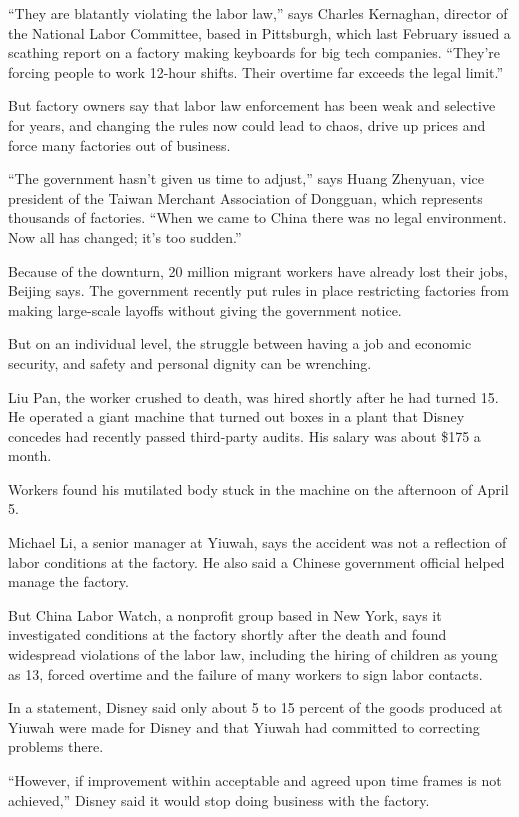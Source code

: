 ﻿\documentclass[12pt,a4paper,onecolumn]{article}
\begin{document}
``They are blatantly violating the labor law,'' says Charles Kernaghan, director of the National
Labor Committee, based in Pittsburgh, which last February issued a scathing report on a factory
making keyboards for big tech companies. ``They're forcing people to work 12-hour shifts. Their
overtime far exceeds the legal limit.''

But factory owners say that labor law enforcement has been weak and selective for years, and
changing the rules now could lead to chaos, drive up prices and force many factories out of
business.

``The government hasn't given us time to adjust,'' says Huang Zhenyuan, vice president of the Taiwan
Merchant Association of Dongguan, which represents thousands of factories. ``When we came to China
there was no legal environment. Now all has changed; it's too sudden.''

Because of the downturn, 20 million migrant workers have already lost their jobs, Beijing says. The
government recently put rules in place restricting factories from making large-scale layoffs without
giving the government notice.

But on an individual level, the struggle between having a job and economic security, and safety and
personal dignity can be wrenching.

Liu Pan, the worker crushed to death, was hired shortly after he had turned 15. He operated a giant
machine that turned out boxes in a plant that Disney concedes had recently passed third-party
audits. His salary was about \$175 a month.

Workers found his mutilated body stuck in the machine on the afternoon of April 5.

Michael Li, a senior manager at Yiuwah, says the accident was not a reflection of labor conditions
at the factory. He also said a Chinese government official helped manage the factory.

But China Labor Watch, a nonprofit group based in New York, says it investigated conditions at the
factory shortly after the death and found widespread violations of the labor law, including the
hiring of children as young as 13, forced overtime and the failure of many workers to sign labor
contacts.

In a statement, Disney said only about 5 to 15 percent of the goods produced at Yiuwah were made for
Disney and that Yiuwah had committed to correcting problems there.

``However, if improvement within acceptable and agreed upon time frames is not achieved,'' Disney
said it would stop doing business with the factory.
\end{document}
